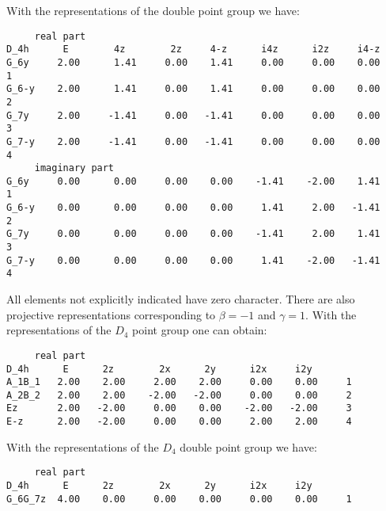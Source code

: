 \documentclass[12pt,a4paper,twoside]{report}
\begin{document}
With the representations of the double point group we have:

\begin{tcolorbox}
\begin{footnotesize}
\begin{verbatim}
     real part
D_4h      E        4z        2z     4-z      i4z      i2z     i4-z
G_6y     2.00      1.41     0.00    1.41     0.00     0.00    0.00    1
G_6-y    2.00      1.41     0.00    1.41     0.00     0.00    0.00    2
G_7y     2.00     -1.41     0.00   -1.41     0.00     0.00    0.00    3
G_7-y    2.00     -1.41     0.00   -1.41     0.00     0.00    0.00    4
     imaginary part
G_6y     0.00      0.00     0.00    0.00    -1.41    -2.00    1.41    1
G_6-y    0.00      0.00     0.00    0.00     1.41     2.00   -1.41    2
G_7y     0.00      0.00     0.00    0.00    -1.41     2.00    1.41    3
G_7-y    0.00      0.00     0.00    0.00     1.41    -2.00   -1.41    4
\end{verbatim}
\end{footnotesize}
\end{tcolorbox}

All elements not explicitly indicated have zero character.
There are also projective representations corresponding to $\beta=-1$ 
and $\gamma=1$. With the representations of the $D_4$ point group one
can obtain:  

\begin{tcolorbox}
\begin{footnotesize}
\begin{verbatim}
     real part
D_4h      E      2z        2x      2y      i2x     i2y
A_1B_1   2.00    2.00     2.00    2.00     0.00    0.00     1 
A_2B_2   2.00    2.00    -2.00   -2.00     0.00    0.00     2
Ez       2.00   -2.00     0.00    0.00    -2.00   -2.00     3
E-z      2.00   -2.00     0.00    0.00     2.00    2.00     4
\end{verbatim}
\end{footnotesize}
\end{tcolorbox}

With the representations of the $D_4$ double point group we have:  

\begin{tcolorbox}
\begin{footnotesize}
\begin{verbatim}
     real part
D_4h      E      2z        2x      2y      i2x     i2y
G_6G_7z  4.00    0.00     0.00    0.00     0.00    0.00     1
\end{verbatim}
\end{footnotesize}
\end{tcolorbox}
\end{document}

